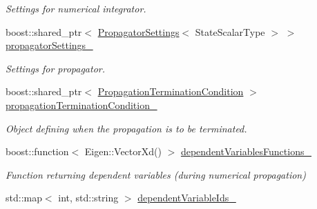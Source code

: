 \begin{DoxyCompactItemize}
\begin{DoxyCompactList}\small\item\em Settings for numerical integrator. \end{DoxyCompactList}\item 
boost\+::shared\+\_\+ptr$<$ \hyperlink{classtudat_1_1propagators_1_1PropagatorSettings}{Propagator\+Settings}$<$ State\+Scalar\+Type $>$ $>$ \hyperlink{classtudat_1_1propagators_1_1DynamicsSimulator_a99c9142e767acc697f85abc88a5e81c6}{propagator\+Settings\+\_\+}\hypertarget{classtudat_1_1propagators_1_1DynamicsSimulator_a99c9142e767acc697f85abc88a5e81c6}{}\label{classtudat_1_1propagators_1_1DynamicsSimulator_a99c9142e767acc697f85abc88a5e81c6}

\begin{DoxyCompactList}\small\item\em Settings for propagator. \end{DoxyCompactList}\item 
boost\+::shared\+\_\+ptr$<$ \hyperlink{classtudat_1_1propagators_1_1PropagationTerminationCondition}{Propagation\+Termination\+Condition} $>$ \hyperlink{classtudat_1_1propagators_1_1DynamicsSimulator_aa0c059ddba0bf32c7d955017da5c72ca}{propagation\+Termination\+Condition\+\_\+}\hypertarget{classtudat_1_1propagators_1_1DynamicsSimulator_aa0c059ddba0bf32c7d955017da5c72ca}{}\label{classtudat_1_1propagators_1_1DynamicsSimulator_aa0c059ddba0bf32c7d955017da5c72ca}

\begin{DoxyCompactList}\small\item\em Object defining when the propagation is to be terminated. \end{DoxyCompactList}\item 
boost\+::function$<$ Eigen\+::\+Vector\+Xd() $>$ \hyperlink{classtudat_1_1propagators_1_1DynamicsSimulator_a44e0cc3b18e9cd546a50919cd1669050}{dependent\+Variables\+Functions\+\_\+}\hypertarget{classtudat_1_1propagators_1_1DynamicsSimulator_a44e0cc3b18e9cd546a50919cd1669050}{}\label{classtudat_1_1propagators_1_1DynamicsSimulator_a44e0cc3b18e9cd546a50919cd1669050}

\begin{DoxyCompactList}\small\item\em Function returning dependent variables (during numerical propagation) \end{DoxyCompactList}\item 
std\+::map$<$ int, std\+::string $>$ \hyperlink{classtudat_1_1propagators_1_1DynamicsSimulator_afe72981aab159e4e5284d314cea67bb8}{dependent\+Variable\+Ids\+\_\+}\hypertarget{classtudat_1_1propagators_1_1DynamicsSimulator_afe72981aab159e4e5284d314cea67bb8}{}\label{classtudat_1_1propagators_1_1DynamicsSimulator_afe72981aab159e4e5284d314cea67bb8}


\end{DoxyCompactItemize}
